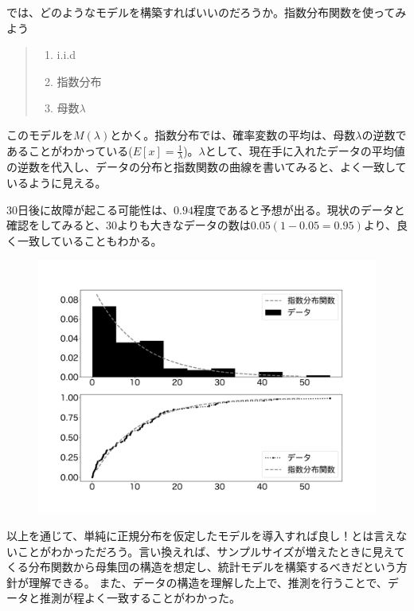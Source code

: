 では、どのようなモデルを構築すればいいのだろうか。指数分布関数を使ってみよう
\begin{quote}
    \begin{enumerate}[(1)]
\item i.i.d
\item 指数分布
\item 母数$\lambda$
\end{enumerate}
\end{quote}
このモデルを$M(\lambda)$とかく。指数分布では、確率変数の平均は、母数$\lambda$の逆数であることがわかっている($E[x]=\frac{1}{\lambda}$)。$\lambda$として、現在手に入れたデータの平均値の逆数を代入し、データの分布と指数関数の曲線を書いてみると、よく一致しているように見える。

30日後に故障が起こる可能性は、$0.94$程度であると予想が出る。現状のデータと確認をしてみると、30よりも大きなデータの数は$0.05(1-0.05=0.95)$より、良く一致していることもわかる。
\begin{figure}
\begin{center}
    \includegraphics[width=15cm]{./image/06_/lambda_0.1.pdf}
\end{center}
\end{figure}





以上を通じて、単純に正規分布を仮定したモデルを導入すれば良し！とは言えないことがわかっただろう。言い換えれば、サンプルサイズが増えたときに見えてくる分布関数から母集団の構造を想定し、統計モデルを構築するべきだという方針が理解できる。
また、データの構造を理解した上で、推測を行うことで、データと推測が程よく一致することがわかった。


